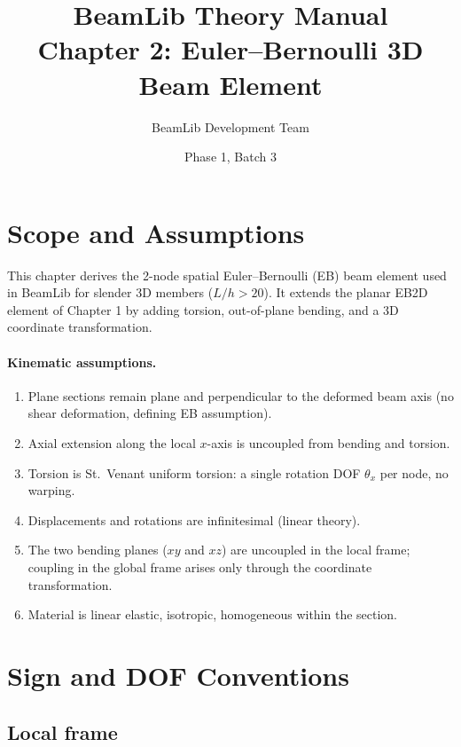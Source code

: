 \documentclass[11pt,a4paper]{article}
\title{BeamLib Theory Manual \\ Chapter 2: Euler--Bernoulli 3D Beam Element}
\author{BeamLib Development Team}
\date{Phase 1, Batch 3}
\begin{document}
\maketitle

\section{Scope and Assumptions}

This chapter derives the 2-node spatial Euler--Bernoulli (EB) beam element used in BeamLib for slender 3D members ($L/h > 20$). It extends the planar EB2D element of Chapter 1 by adding torsion, out-of-plane bending, and a 3D coordinate transformation.

\paragraph{Kinematic assumptions.}
\begin{enumerate}
    \item Plane sections remain plane and perpendicular to the deformed beam axis (no shear deformation, defining EB assumption).
    \item Axial extension along the local $x$-axis is uncoupled from bending and torsion.
    \item Torsion is St.\ Venant uniform torsion: a single rotation DOF $\theta_x$ per node, no warping.
    \item Displacements and rotations are infinitesimal (linear theory).
    \item The two bending planes ($xy$ and $xz$) are uncoupled in the local frame; coupling in the global frame arises only through the coordinate transformation.
    \item Material is linear elastic, isotropic, homogeneous within the section.
\end{enumerate}

\section{Sign and DOF Conventions}

\subsection{Local frame}\label{sec:local-frame}
\end{document}
